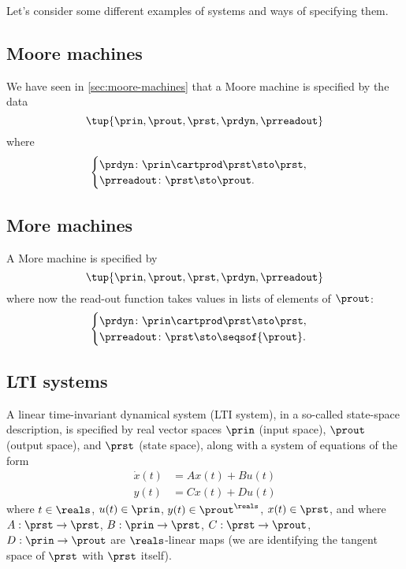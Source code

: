 Let's consider some different examples of systems and ways of specifying them.

\subsection{Moore machines}

We have seen in \cref{sec:moore-machines}  that a Moore machine is specified by the data
\begin{equation}
\tup{\prin, \prout, \prst, \prdyn, \prreadout}
\end{equation}
where 
\begin{equation}\label{eq:moore-specification-again}
    \begin{cases}
        \prdyn \colon \prin \cartprod \prst \sto \prst, \\
        \prreadout \colon \prst \sto \prout.
    \end{cases}
\end{equation}

\subsection{More machines}

A More machine is specified by
\begin{equation}
\tup{\prin, \prout, \prst, \prdyn, \prreadout}
\end{equation}
where now the read-out function takes values in lists of elements of $\prout$: 
\begin{equation}\label{eq:moore-specification-again}
    \begin{cases}
        \prdyn \colon \prin \cartprod \prst \sto \prst, \\
        \prreadout \colon \prst \sto \seqsof{\prout}.
    \end{cases}
\end{equation}

\subsection{LTI systems}

A linear time-invariant dynamical system (LTI system), in a so-called state-space description, is specified by real vector spaces $\prin$ (input space), $\prout$ (output space), and $\prst$ (state space), along with a system of equations of the form
\begin{align}
        \dot x(t) &= Ax(t) + Bu(t) \label{eq:LTI-system-dyn} \\
        y(t) &= Cx(t) + Du(t) \label{eq:LTI-system-ro}
\end{align}
where $t \in \reals$, $u(t) \in \prin$, $y(t) \in \prout^\reals$, $x(t) \in \prst$, and where $A: \prst \to \prst$, $B: \prin \to \prst$, $C: \prst \to \prout$, $D: \prin \to \prout$ are $\reals$-linear maps (we are identifying the tangent space of $\prst$ with $\prst$ itself). 

